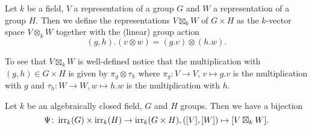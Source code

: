 \begin{defi}
  Let $k$ be a field, $V$ a representation of a group $G$ and $W$ a representation of a group $H$.
  Then we define the representations $V \boxtimes_k W$ of $G \times H$ as the $k$-vector space $V \otimes_k W$ together with the (linear) group action
  \[
      (g,h).(v \otimes w)
    = (g.v) \otimes (h.w).
  \]
\end{defi}


To see that $V \boxtimes_k W$ is well-defined notice that the multiplication with $(g,h) \in G \times H$ is given by $\pi_g \otimes \tau_h$ where $\pi_g \colon V \to V$, $v \mapsto g.v$ is the multiplication with $g$ and $\tau_h \colon W \to W, w \mapsto h.w$ is the multiplication with $h$.


\begin{thrm}
  Let $k$ be an algebraically closed field, $G$ and $H$ groups.
  Then we have a bijection
  \[
            \Psi
    \colon  \operatorname{irr}_k(G) \times \operatorname{irr}_k(H)
    \to     \operatorname{irr}_k(G \times H),
            ([V],[W])
    \mapsto [V \boxtimes_k W].
  \]
\end{thrm}
